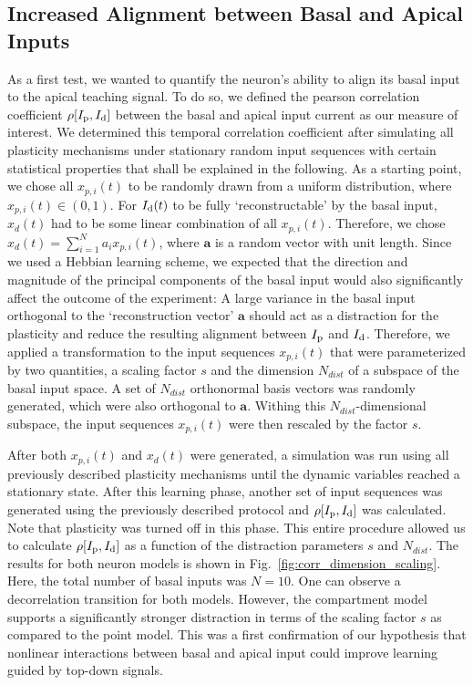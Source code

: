 \documentclass[10pt,a4paper,twocolumn]{article}
\begin{document}
		\subsection{Increased Alignment between Basal and Apical Inputs}
		\label{sect:alignment}
		
		As a first test, we wanted to quantify the neuron's ability to 
		align its basal input to the apical teaching signal.
		To do so, we defined the pearson correlation coefficient
		$\rho[I_{\rm p},I_{\rm d}]$ between the basal and apical input current
		as our measure of interest. We determined this temporal
		correlation coefficient after simulating all plasticity mechanisms
		under stationary random input sequences with certain statistical
		properties that shall be explained in the following.
		As a starting point, we chose all $x_{p,i}(t)$ to be randomly
		drawn from a uniform distribution, where $x_{p,i}(t) \in (0,1)$.
		For $I_{\rm d}(t)$ to be fully `reconstructable' by the basal input, 
		$x_d(t)$ had to be some linear combination of all $x_{p,i}(t)$.
		Therefore, we chose $x_d(t) = \sum_{i=1}^N a_i x_{p,i}(t)$, where
		$\mathbf{a}$ is a random vector with unit length.
		Since we used a Hebbian learning scheme, we expected that 
		the direction and magnitude of the principal components of 
		the basal input would also significantly affect the outcome of
		the experiment: A large variance in the basal input 
		orthogonal to the `reconstruction vector' $\mathbf{a}$ 
		should act as a distraction for the plasticity and reduce the
		resulting alignment between $I_{\rm p}$ and $I_{\rm d}$. Therefore, we 
		applied a transformation to the input sequences $x_{p,i}(t)$
		that were parameterized by two quantities, a scaling factor $s$
		and the dimension $N_{dist}$ of a subspace of the basal input space.
		A set of $N_{dist}$ orthonormal basis vectors was randomly generated,
		which were also orthogonal to $\mathbf{a}$. Withing this $N_{dist}$-dimensional
		subspace, the input sequences $x_{p,i}(t)$ were then rescaled by the
		factor $s$. 
		
		After both $x_{p,i}(t)$ and $x_d(t)$ were generated,
		a simulation was run using all previously described plasticity
		mechanisms until the dynamic variables reached a stationary state.
		After this learning phase, another set of input sequences was generated
		using the previously described protocol and $\rho[I_{\rm p},I_{\rm d}]$ was calculated.
		Note that plasticity was turned off in this phase. This entire procedure
		allowed us to calculate $\rho[I_{\rm p},I_{\rm d}]$ as a function of the distraction
		parameters $s$ and $N_{dist}$. The results for both neuron models 
		is shown in Fig.~\ref{fig:corr_dimension_scaling}. Here, the total number of 
		basal inputs was $N=10$. One can observe a decorrelation transition for 
		both models. However, the compartment model supports a significantly stronger
		distraction in terms of the scaling factor $s$ as compared to the point model.
		This was a first confirmation of our hypothesis that nonlinear interactions
		between basal and apical input could improve learning guided by top-down signals.
		
\end{document}

